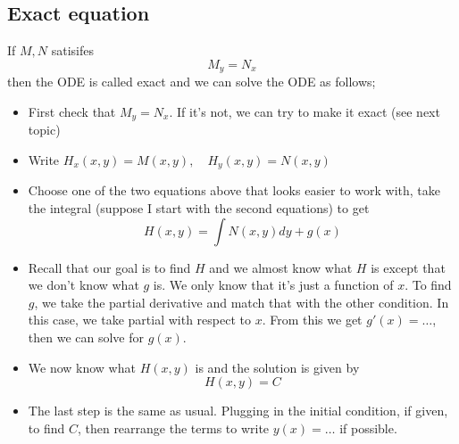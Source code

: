 \documentclass[10pt]{amsart}
\newcommand{\bi}{\begin{itemize}}
\newcommand{\ei}{\end{itemize}}
\begin{document}
\vspace{0.2in}
\subsection*{Exact equation}
If $M,N$ satisifes
$$ M_{y} = N_{x}$$
then the ODE is called exact and we can solve the ODE as follows;
\bi
\item First check that $M_{y} = N_{x}$. If it's not, we can try to make it exact (see next topic)
\item Write $ H_{x}(x,y)  = M(x,y), \quad H_{y}(x,y) = N(x,y) $ 
\item Choose one of the two equations above that looks easier to work with, take the integral (suppose I start with the second equations) to get
$$ H(x,y) = \int N(x,y)dy + g(x) $$
\item  Recall that our goal is to find $H$ and we almost know what $H$ is except that we don't know what $g$ is. We only know that it's just a function of $x$. To find $g$, we take the partial derivative and match that with the other condition. In this case, we take partial with respect to $x$. From this we get $g'(x) = \dots$, then we can solve for $g(x)$. \\ 
\item We now know what $H(x,y)$ is and the solution is given by
$$ H(x,y) = C $$
\item The last step is the same as usual. Plugging in the initial condition, if given, to find $C$, then rearrange the terms to write $y(x) = \dots$ if possible.
\ei

\vspace{0.2in}
\end{document}
